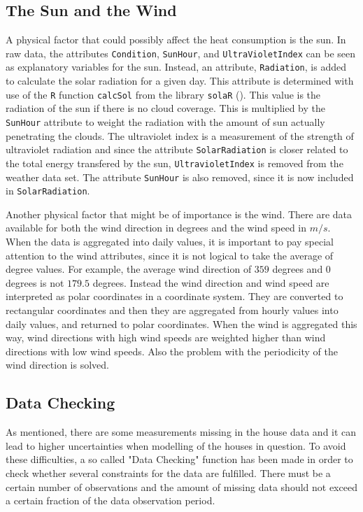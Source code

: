 \subsection{The Sun and the Wind}
\noindent A physical factor that could possibly affect the heat consumption is the sun. In raw data, the attributes \texttt{Condition}, \texttt{SunHour},  and \texttt{UltraVioletIndex} can be seen as explanatory variables for the sun. Instead, an attribute, \texttt{Radiation}, is added to calculate the solar radiation for a given day. This attribute is determined with use of the \texttt{R} function \texttt{calcSol} from the library \texttt{solaR} (\cite{solaR}). This value is the radiation of the sun if there is no cloud coverage. This is multiplied by the \texttt{SunHour} attribute to weight the radiation with the amount of sun actually penetrating the clouds. The ultraviolet index is a measurement of the strength of ultraviolet radiation and since the attribute \texttt{SolarRadiation} is closer related to the total energy transfered by the sun, \texttt{UltravioletIndex} is removed from the weather data set. The attribute \texttt{SunHour} is also removed, since it is now included in \texttt{SolarRadiation}.

\noindent Another physical factor that might be of importance is the wind. There are data available for both the wind direction in degrees and the wind speed in $m/s$. When the data is aggregated into daily values, it is important to pay special attention to the wind attributes, since it is not logical to take the average of degree values. For example, the average wind direction of $359$ degrees and $0$ degrees is not $179.5$ degrees. Instead the wind direction and wind speed are interpreted as polar coordinates in a coordinate system. They are converted to rectangular coordinates and then they are aggregated from hourly values into daily values, and returned to polar coordinates.  When the wind is aggregated this way, wind directions with high wind speeds are weighted higher than wind directions with low wind speeds. Also the problem with the periodicity of the wind direction is solved.


\subsection{Data Checking}
As mentioned, there are some measurements missing in the house data and it can lead to higher uncertainties when modelling of the houses in question. To avoid these difficulties, a so called "Data Checking" function has been made in order to check whether several constraints for the data are fulfilled. There must be a certain number of observations and the amount of missing data should not exceed a certain fraction of the data observation period.

